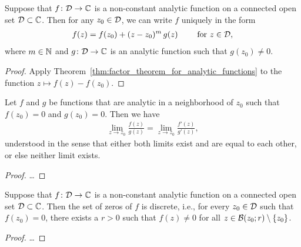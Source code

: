 \begin{corollary}
  \label{cor:analytic_local_representation}
  Suppose that $f \colon \Domain \to \bC$ is a non-constant analytic function
  on a connected open set $\Domain \subset \bC$.
  Then for any $z_0 \in \Domain$, we can write $f$ uniquely in the form
  \begin{align*}
    f(z) = f(z_0) + (z - z_0)^m \, g(z) \qquad \text{ for } z \in \Domain ,
  \end{align*}
  where $m \in \bN$ and $g \colon \Domain \to \bC$ is an analytic
  function such that $g(z_0) \ne 0$.
\end{corollary}
\begin{proof}
  Apply Theorem~\ref{thm:factor_theorem_for_analytic_functions} to the
  function $z \mapsto f(z) - f(z_0)$.
\end{proof}

\begin{theorem}
  \label{thm:l_hospital_rule}
  Let $f$ and $g$ be functions that are analytic in a neighborhood of $z_0$
  such that $f(z_0) = 0$ and $g(z_0) = 0$. Then we have
  \begin{align*}
    \lim_{z \to z_0} \frac{f(z)}{g(z)} = \lim_{z \to z_0} \frac{f'(z)}{g'(z)} ,
  \end{align*}
  understood in the sense that either both limits exist and are equal
  to each other, or else neither limit exists.
\end{theorem}
\begin{proof}
  \ldots
\end{proof}

\begin{theorem}
  \label{thm:discrete_mapping_theorem}
  Suppose that $f \colon \Domain \to \bC$ is a non-constant
  analytic function on a connected open set $\Domain \subset \bC$.
  Then the set of zeros of $f$ is discrete, i.e., for
  every $z_0 \in \Domain$ such that $f(z_0)=0$,
  there exists a $r>0$ such that $f(z) \ne 0$
  for all $z \in \BallRC{r}{z_0} \setminus \set{z_0}$.
\end{theorem}
\begin{proof}
  \ldots
\end{proof}

